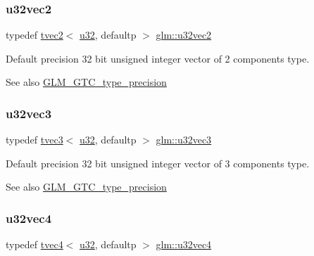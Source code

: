 \subsubsection{\texorpdfstring{u32vec2}{u32vec2}}
{\footnotesize\ttfamily typedef \hyperlink{structglm_1_1tvec2}{tvec2}$<$ \hyperlink{group__gtc__type__precision_ga54e837745059fd29017bed71cfa0a8db}{u32}, defaultp $>$ \hyperlink{group__gtc__type__precision_gad3a81c0d5a6941bb9ffdc9fa8611b426}{glm\+::u32vec2}}

Default precision 32 bit unsigned integer vector of 2 components type. \begin{DoxySeeAlso}{See also}
\hyperlink{group__gtc__type__precision}{G\+L\+M\+\_\+\+G\+T\+C\+\_\+type\+\_\+precision} 
\end{DoxySeeAlso}
\mbox{\label{group__gtc__type__precision_ga16b26751ba6b83c8a0226b9834d73fdc}} 
\subsubsection{\texorpdfstring{u32vec3}{u32vec3}}
{\footnotesize\ttfamily typedef \hyperlink{structglm_1_1tvec3}{tvec3}$<$ \hyperlink{group__gtc__type__precision_ga54e837745059fd29017bed71cfa0a8db}{u32}, defaultp $>$ \hyperlink{group__gtc__type__precision_ga16b26751ba6b83c8a0226b9834d73fdc}{glm\+::u32vec3}}

Default precision 32 bit unsigned integer vector of 3 components type. \begin{DoxySeeAlso}{See also}
\hyperlink{group__gtc__type__precision}{G\+L\+M\+\_\+\+G\+T\+C\+\_\+type\+\_\+precision} 
\end{DoxySeeAlso}
\mbox{\label{group__gtc__type__precision_ga6e966cda0025699449a36b41f1787927}} 
\subsubsection{\texorpdfstring{u32vec4}{u32vec4}}
{\footnotesize\ttfamily typedef \hyperlink{structglm_1_1tvec4}{tvec4}$<$ \hyperlink{group__gtc__type__precision_ga54e837745059fd29017bed71cfa0a8db}{u32}, defaultp $>$ \hyperlink{group__gtc__type__precision_ga6e966cda0025699449a36b41f1787927}{glm\+::u32vec4}}

